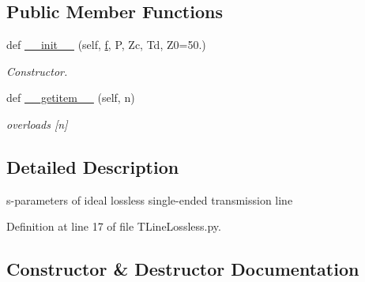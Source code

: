 \subsection*{Public Member Functions}
\begin{DoxyCompactItemize}
\item 
def \hyperlink{classSignalIntegrity_1_1SParameters_1_1Devices_1_1TLineLossless_1_1TLineLossless_a392b53d98394dd9067924804c683ea5c}{\+\_\+\+\_\+init\+\_\+\+\_\+} (self, \hyperlink{classSignalIntegrity_1_1SParameters_1_1SParameters_1_1SParameters_a32e7a34d6837fe949b413c852a0447f8}{f}, P, Zc, Td, Z0=50.)
\begin{DoxyCompactList}\small\item\em Constructor. \end{DoxyCompactList}\item 
def \hyperlink{classSignalIntegrity_1_1SParameters_1_1Devices_1_1TLineLossless_1_1TLineLossless_ab7a6da5139e0878b590d68292aaa70f2}{\+\_\+\+\_\+getitem\+\_\+\+\_\+} (self, n)
\begin{DoxyCompactList}\small\item\em overloads \mbox{[}n\mbox{]} \end{DoxyCompactList}\end{DoxyCompactItemize}


\subsection{Detailed Description}
s-\/parameters of ideal lossless single-\/ended transmission line 

Definition at line 17 of file T\+Line\+Lossless.\+py.



\subsection{Constructor \& Destructor Documentation}
\mbox{\label{classSignalIntegrity_1_1SParameters_1_1Devices_1_1TLineLossless_1_1TLineLossless_a392b53d98394dd9067924804c683ea5c}} 
